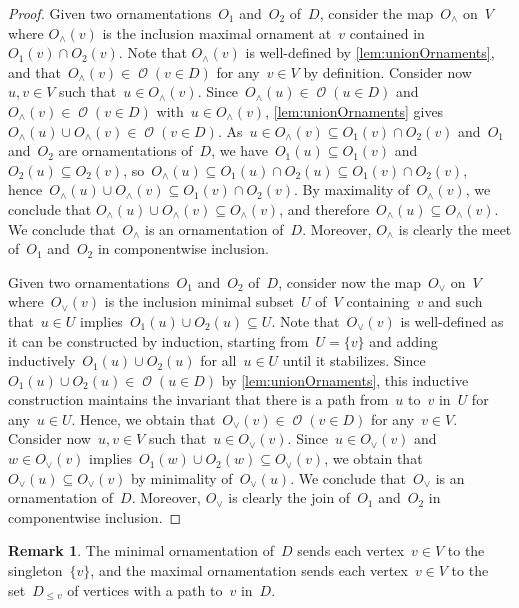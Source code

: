 \documentclass{amsart}
\theoremstyle{definition}
\newtheorem{remark}[theorem]{Remark}
\renewcommand{\c}[1]{\mathcal{#1}} %
\newcommand{\meet}{\wedge} %
\newcommand{\join}{\vee} %
\newcommand{\lessin}[2]{#1_{\le#2}} %
\DeclareMathOperator{\Orn}{\c{O}}  %
\begin{document}
\begin{proof}
Given two ornamentations~$O_1$ and~$O_2$ of~$D$, consider the map~$O_\meet$ on~$V$ where $O_\meet(v)$ is the inclusion maximal ornament at~$v$ contained in~$O_1(v) \cap O_2(v)$.
Note that $O_\meet(v)$ is well-defined by \cref{lem:unionOrnaments}, and that~$O_\meet(v) \in \Orn(v \in D)$ for any~$v \in V$ by definition.
Consider now~$u,v \in V$ such that~$u \in O_\meet(v)$.
Since~$O_\meet(u) \in \Orn(u \in D)$ and~$O_\meet(v) \in \Orn(v \in D)$ with~${u \in O_\meet(v)}$, \cref{lem:unionOrnaments} gives~$O_\meet(u) \cup O_\meet(v) \in \Orn(v \in D)$.
As~$u \in O_\meet(v) \subseteq O_1(v) \cap O_2(v)$ and~$O_1$ and~$O_2$ are ornamentations of~$D$, we have~$O_1(u) \subseteq O_1(v)$ and~$O_2(u) \subseteq O_2(v)$, so~${O_\meet(u) \subseteq O_1(u) \cap O_2(u) \subseteq O_1(v) \cap O_2(v)}$, hence~$O_\meet(u) \cup O_\meet(v) \subseteq O_1(v) \cap O_2(v)$.
By maximality of~$O_\meet(v)$, we conclude that ${O_\meet(u) \cup O_\meet(v) \subseteq O_\meet(v)}$, and therefore~$O_\meet(u) \subseteq O_\meet(v)$.
We conclude that~$O_\meet$ is an ornamentation of~$D$.
Moreover, $O_\meet$ is clearly the meet of~$O_1$ and~$O_2$ in componentwise inclusion.

Given two ornamentations~$O_1$ and~$O_2$ of~$D$, consider now the map~$O_\join$ on~$V$ where~$O_\join(v)$ is the inclusion minimal subset~$U$ of~$V$ containing~$v$ and such that~$u \in U$ implies~$O_1(u) \cup O_2(u) \subseteq U$.
Note that~$O_\join(v)$ is well-defined as it can be constructed by induction, starting from~$U = \{v\}$ and adding inductively~$O_1(u) \cup O_2(u)$ for all~$u \in U$ until it stabilizes.
Since~$O_1(u) \cup O_2(u) \in \Orn(u \in D)$ by \cref{lem:unionOrnaments}, this inductive construction maintains the invariant that there is a path from~$u$ to~$v$ in~$U$ for any~$u \in U$.
Hence, we obtain that~$O_\join(v) \in \Orn(v \in D)$ for any~$v \in V$.
Consider now~$u,v \in V$ such that~$u \in O_\join(v)$.
Since~$u \in O_\join(v)$ and~$w \in O_\join(v)$ implies~$O_1(w) \cup O_2(w) \subseteq O_\join(v)$, we obtain that~$O_\join(u) \subseteq O_\join(v)$ by minimality of~$O_\join(u)$.
We conclude that~$O_\join$ is an ornamentation of~$D$.
Moreover, $O_\join$ is clearly the join of~$O_1$ and~$O_2$ in componentwise inclusion.
\end{proof}

\begin{remark}
The minimal ornamentation of~$D$ sends each vertex~$v \in V$ to the singleton~$\{v\}$, and the maximal ornamentation sends each vertex~$v \in V$ to the set~$\lessin{D}{v}$ of vertices with a path to~$v$ in~$D$.
\end{remark}
\end{document}
